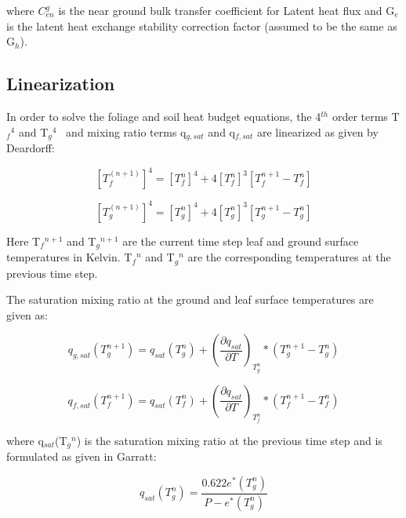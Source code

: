 where \(C_{en}^g\) is the near ground bulk transfer coefficient for Latent heat flux and G\(_{e}\) is the latent heat exchange stability correction factor (assumed to be the same as G\(_{h}\)).

\subsection{Linearization}\label{linearization}

In order to solve the foliage and soil heat budget equations, the 4\(^{th}\) order terms T\(_{f}\)\(^{4}\) and T\(_{g}\)\(^{4}\) ~and mixing ratio terms q\(_{g,sat}\) and q\(_{f,sat}\) are linearized as given by Deardorff:

\begin{equation}
{\left[ {T_f^{\left( {n + 1} \right)}} \right]^4} = {\left[ {T_f^n} \right]^4} + 4{\left[ {T_f^n} \right]^3}\left[ {T_f^{n + 1} - T_f^n} \right]
\end{equation}

\begin{equation}
{\left[ {T_g^{\left( {n + 1} \right)}} \right]^4} = {\left[ {T_g^n} \right]^4} + 4{\left[ {T_g^n} \right]^3}\left[ {T_g^{n + 1} - T_g^n} \right]
\end{equation}

Here T\(_{f}\)\(^{n+1}\) and T\(_{g}\)\(^{n+1}\) are the current time step leaf and ground surface temperatures in Kelvin. T\(_{f}\)\(^{n}\) and T\(_{g}\)\(^{n}\) are the corresponding temperatures at the previous time step.

The saturation mixing ratio at the ground and leaf surface temperatures are given as:

\begin{equation}
{q_{g,sat}}\left( {T_g^{n + 1}} \right) = {q_{sat}}\left( {T_g^n} \right) + {\left( {\frac{{\partial {q_{sat}}}}{{\partial T}}} \right)_{T_g^n}} * \left( {T_g^{n + 1} - T_g^n} \right)
\end{equation}

\begin{equation}
{q_{f,sat}}\left( {T_f^{n + 1}} \right) = {q_{sat}}\left( {T_f^n} \right) + {\left( {\frac{{\partial {q_{sat}}}}{{\partial T}}} \right)_{T_f^n}} * \left( {T_f^{n + 1} - T_f^n} \right)
\end{equation}

where q\(_{sat}\)(T\(_{g}\)\(^{n}\)) is the saturation mixing ratio at the previous time step and is formulated as given in Garratt:

\begin{equation}
{q_{sat}}\left( {T_g^n} \right) = \frac{{0.622{e^ * }\left( {T_g^n} \right)}}{{P - {e^ * }\left( {T_g^n} \right)}}
\end{equation}

